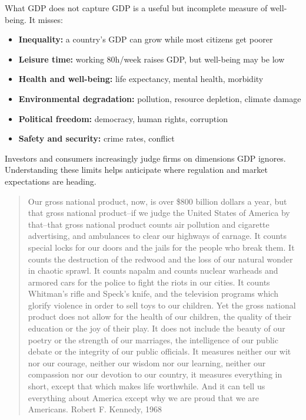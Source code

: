 \documentclass[aspectratio=169]{beamer}
\begin{document}
\begin{frame}[t]{What GDP does not capture}
   \small
   GDP is a useful but incomplete measure of well-being. It misses:
   \vspace{0.1cm}
   \begin{itemize}
      \setlength\itemsep{0.1cm}
      \item \textbf{Inequality:} a country's GDP can grow while most citizens get poorer
      \item \textbf{Leisure time:} working 80h/week raises GDP, but well-being may be low
      \item \textbf{Health and well-being:} life expectancy, mental health, morbidity
      \item \textbf{Environmental degradation:} pollution, resource depletion, climate damage
      \item \textbf{Political freedom:} democracy, human rights, corruption
      \item \textbf{Safety and security:} crime rates, conflict
   \end{itemize}
   \vspace{0.05cm}
   \begin{bizimplication}
      \footnotesize Investors and consumers increasingly judge firms on dimensions GDP ignores. Understanding these limits helps anticipate where regulation and market expectations are heading.
   \end{bizimplication}
\end{frame}

\begin{frame}{}
   \small
   \begin{quotation}
      Our gross national product, now, is over \$800 billion dollars a year, but that gross national product–if we judge the United States of America by that–that gross national product counts air pollution and cigarette advertising, and ambulances to clear our highways of carnage. It counts special locks for our doors and the jails for the people who break them. It counts the destruction of the redwood and the loss of our natural wonder in chaotic sprawl. It counts napalm and counts nuclear warheads and armored cars for the police to fight the riots in our cities. It counts Whitman’s rifle and Speck’s knife, and the television programs which glorify violence in order to sell toys to our children. Yet the gross national product does not allow for the health of our children, the quality of their education or the joy of their play. It does not include the beauty of our poetry or the strength of our marriages, the intelligence of our public debate or the integrity of our public officials. It measures neither our wit nor our courage, neither our wisdom nor our learning, neither our compassion nor our devotion to our country, it measures everything in short, except that which makes life worthwhile. And it can tell us everything about America except why we are proud that we are Americans.
      \hfill{\scriptsize\textcolor{HECgray}{Robert F. Kennedy, 1968}}
   \end{quotation}
\end{frame}
\end{document}
